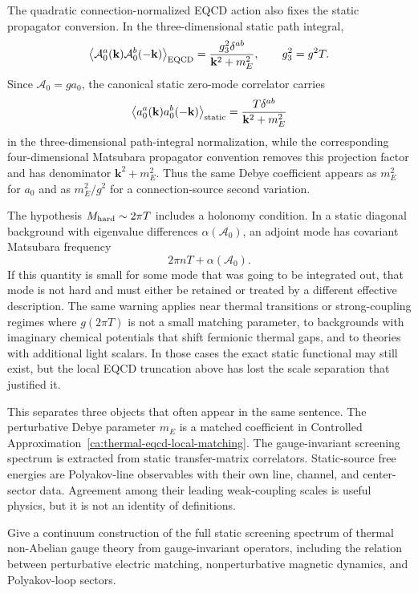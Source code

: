 \begin{controlledapproximation}
The quadratic connection-normalized EQCD action also fixes the static
propagator conversion.  In the three-dimensional static path integral,
\[
  \left\langle
  \mathcal A_0^a(\mathbf k)\mathcal A_0^b(-\mathbf k)
  \right\rangle_{\rm EQCD}
  =
  \frac{g_3^2\delta^{ab}}{\mathbf k^2+m_E^2},
  \qquad
  g_3^2=g^2T.
\]
Since \(\mathcal A_0=ga_0\), the canonical static zero-mode correlator carries
\[
  \left\langle a_0^a(\mathbf k)a_0^b(-\mathbf k)\right\rangle_{\rm static}
  =
  \frac{T\delta^{ab}}{\mathbf k^2+m_E^2}
\]
in the three-dimensional path-integral normalization, while the corresponding
four-dimensional Matsubara propagator convention removes this projection
factor and has denominator \(\mathbf k^2+m_E^2\).  Thus the same Debye
coefficient appears as \(m_E^2\) for \(a_0\) and as \(m_E^2/g^2\) for a
connection-source second variation.
\end{controlledapproximation}

The hypothesis \(M_{\rm hard}\sim2\pi T\) includes a holonomy condition.  In
a static diagonal background with eigenvalue differences
\(\alpha(\mathcal A_0)\), an adjoint mode has covariant Matsubara frequency
\[
  2\pi nT+\alpha(\mathcal A_0).
\]
If this quantity is small for some mode that was going to be integrated out,
that mode is not hard and must either be retained or treated by a different
effective description.  The same warning applies near thermal transitions or
strong-coupling regimes where \(g(2\pi T)\) is not a small matching parameter,
to backgrounds with imaginary chemical potentials that shift fermionic
thermal gaps, and to theories with additional light scalars.  In those cases
the exact static functional may still exist, but the local EQCD truncation
above has lost the scale separation that justified it.

This separates three objects that often appear in the same sentence.  The
perturbative Debye parameter \(m_E\) is a matched coefficient in
Controlled Approximation~\ref{ca:thermal-eqcd-local-matching}.  The
gauge-invariant screening spectrum is extracted from static transfer-matrix
correlators.  Static-source free energies are Polyakov-line observables with
their own line, channel, and center-sector data.  Agreement among their
leading weak-coupling scales is useful physics, but it is not an identity of
definitions.

\begin{openproblem}
\label{op:gauge-invariant-screening-spectrum}
Give a continuum construction of the full static screening spectrum of
thermal non-Abelian gauge theory from gauge-invariant operators, including
the relation between perturbative electric matching, nonperturbative magnetic
dynamics, and Polyakov-loop sectors.
\end{openproblem}
